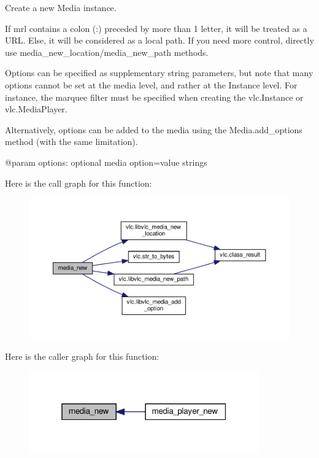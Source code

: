 \begin{DoxyVerb}Create a new Media instance.

If mrl contains a colon (:) preceded by more than 1 letter, it
will be treated as a URL. Else, it will be considered as a
local path. If you need more control, directly use
media_new_location/media_new_path methods.

Options can be specified as supplementary string parameters,
but note that many options cannot be set at the media level,
and rather at the Instance level. For instance, the marquee
filter must be specified when creating the vlc.Instance or
vlc.MediaPlayer.

Alternatively, options can be added to the media using the
Media.add_options method (with the same limitation).

@param options: optional media option=value strings
\end{DoxyVerb}
 Here is the call graph for this function\+:
\nopagebreak
\begin{figure}[H]
\begin{center}
\leavevmode
\includegraphics[width=350pt]{classvlc_1_1_instance_ac9af019663459bddfa7376f3692754d9_cgraph}
\end{center}
\end{figure}
Here is the caller graph for this function\+:
\nopagebreak
\begin{figure}[H]
\begin{center}
\leavevmode
\includegraphics[width=280pt]{classvlc_1_1_instance_ac9af019663459bddfa7376f3692754d9_icgraph}
\end{center}
\end{figure}
\mbox{\label{classvlc_1_1_instance_ab99461d314ff3b327e2beca5816ec1ad}} 
